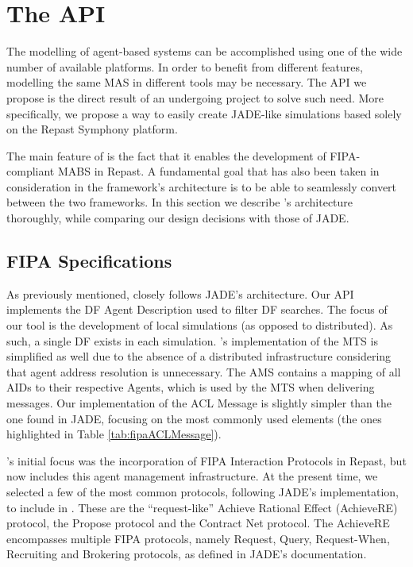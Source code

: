 \section{The \apiname{} API} %
\label{sec:proposal}

The modelling of agent-based systems can be accomplished using one of the wide number of available platforms. In order to benefit from different features, modelling the same MAS in different tools may be necessary.
The API we propose is the direct result of an undergoing project to solve such need. More specifically, we propose a way to easily create JADE-like simulations based solely on the Repast Symphony platform.

The main feature of \apiname{} is the fact that it enables the development of FIPA-compliant MABS in Repast.
A fundamental goal that has also been taken in consideration in the framework's architecture is to be able to seamlessly convert between the two frameworks.
In this section we describe \apiname{}'s architecture thoroughly, while comparing our design decisions with those of JADE.


\subsection{\gls{FIPA} Specifications}

As previously mentioned, \apiname{} closely follows JADE's architecture.
Our API implements the DF Agent Description used to filter DF searches. The focus of our tool is the development of local simulations (as opposed to distributed). As such, a single DF exists in each simulation. \apiname{}'s implementation of the MTS is simplified as well due to the absence of a distributed infrastructure considering that agent address resolution is unnecessary. The AMS contains a mapping of all AIDs to their respective Agents, which is used by the MTS when delivering messages.
Our implementation of the ACL Message is slightly simpler than the one found in JADE, focusing on the most commonly used elements (the ones highlighted in Table \ref{tab:fipaACLMessage}).

\apiname{}'s initial focus was the incorporation of \gls{FIPA} Interaction Protocols in Repast, but now includes this agent management infrastructure. At the present time, we selected a few of the most common protocols, following JADE's implementation, to include in \apiname{}.
These are the ``request-like'' Achieve Rational Effect (AchieveRE) protocol, the Propose protocol and the Contract Net protocol. The AchieveRE encompasses multiple \gls{FIPA} protocols, namely Request, Query, Request-When, Recruiting and Brokering protocols, as defined in JADE's documentation.


